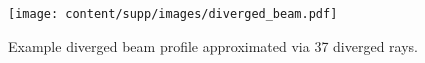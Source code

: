 \begin{figure}[t]
\centering
\texttt{[image: content/supp/images/diverged\_beam.pdf]}
\caption{Example diverged beam profile approximated via 37 diverged rays.}
\label{fig:diverged_ray}
\end{figure}